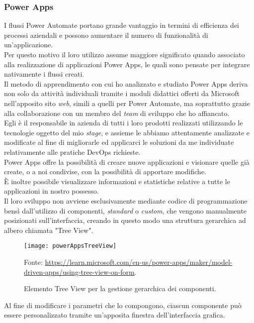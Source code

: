 \subsubsection*{Power Apps}
I flussi Power Automate portano grande vantaggio in termini di efficienza dei processi aziendali e possono aumentare il numero di funzionalità di un'applicazione.\\
Per questo motivo il loro utilizzo assume maggiore significato quando associato alla realizzazione di applicazioni Power Apps, le quali sono pensate per integrare nativamente i flussi creati.\\
Il metodo di apprendimento con cui ho analizzato e studiato Power Apps deriva non solo da attività individuali tramite i moduli didattici offerti da Microsoft nell'apposito sito \emph{web}, simili a quelli per Power Automate, ma soprattutto grazie alla collaborazione con un membro del \emph{team} di sviluppo che ho affiancato.\\
Egli è il responsabile in azienda di tutti i loro prodotti realizzati utilizzando le tecnologie oggetto del mio \emph{stage}, e assieme le abbiamo attentamente analizzate e modificate al fine di migliorarle ed applicarci le soluzioni da me individuate relativamente alle pratiche \gls{DevOps} richieste.\\
Power Apps offre la possibilità di creare nuove applicazioni e visionare quelle già create, o a noi condivise, con la possibilità di apportare modifiche.\\
È inoltre possibile visualizzare informazioni e statistiche relative a tutte le applicazioni in nostro possesso.\\
Il loro sviluppo non avviene esclusivamente mediante codice di programmazione bensì dall'utilizzo di componenti, \emph{standard} o \emph{custom}, che vengono manualmente posizionati sull'interfaccia, creando in questo modo una struttura gerarchica ad albero chiamata "Tree View".
\begin{figure}[htbp] 
    \centering 
    \texttt{[image: powerAppsTreeView]} 
    \caption{Elemento Tree View per la gestione gerarchica dei componenti.}
    \label{fig:powerAppsTreeView}
    \vspace{1mm}
    Fonte: \url{https://learn.microsoft.com/en-us/power-apps/maker/model-driven-apps/using-tree-view-on-form}.
\end{figure}
\newline \noindent Al fine di modificare i parametri che lo compongono, ciascun componente può essere personalizzato tramite un'apposita finestra dell'interfaccia grafica.\\
